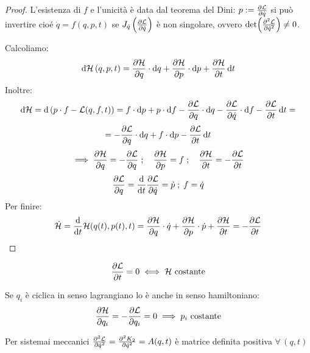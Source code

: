 \begin{proof}
    L'esistenza di $f$ e l'unicità è data dal teorema del Dini: $p:= \pdv{\mathcal{L}}{\dot{q}}(q,\dot{q},t)$ si può invertire
    cioé $\dot{q}= f(q,p,t)$ se $J_{\dot{q}}\left( \pdv{\mathcal{L}}{\dot{q}} \right)$ è non singolare, ovvero $\det(\pdv[2]{\mathcal{L}}{\dot{q}})\neq 0$.

    Calcoliamo:
    \begin{equation*}
        \dd{\mathcal{H}}(q,p,t)= \pdv{\mathcal{H}}{q}\cdot\dd{q}+\pdv{\mathcal{H}}{p}\cdot\dd{p}+\pdv{\mathcal{H}}{t}\dd{t}
    \end{equation*}
    Inoltre:
    \begin{equation*}
        \dd{\mathcal{H}}= \dd{\left( p\cdot f -\mathcal{L}(q,f,t) \right)}= 
        f\cdot\dd{p}+ p\cdot\dd{f}-\pdv{\mathcal{L}}{q}\cdot\dd{q}-\pdv{\mathcal{L}}{\dot{q}}\cdot\dd{f}-\pdv{\mathcal{L}}{t}\dd{t}=
    \end{equation*}
    \begin{equation*}
        = -\pdv{\mathcal{L}}{q}\cdot\dd{q}+f\cdot\dd{p}-\pdv{\mathcal{L}}{t}\dd{t}
    \end{equation*}
    \begin{equation}
        \implies \pdv{\mathcal{H}}{q}= -\pdv{\mathcal{L}}{q}\;;\quad \pdv{\mathcal{H}}{p}= f \;;\quad \pdv{\mathcal{H}}{t}= -\pdv{\mathcal{L}}{t}
    \end{equation}
    \begin{equation*}
        \pdv{\mathcal{L}}{q}= \dv{t}\pdv{\mathcal{L}}{\dot{q}} = \dot{p}\;;\; f = \dot{q}
    \end{equation*}
    Per finire:
    \begin{equation*}
        \dot{\mathcal{H}}= \dv{t}\mathcal{H}(q(t),p(t),t)= \pdv{\mathcal{H}}{q}\cdot \dot{q}+\pdv{\mathcal{H}}{p}\cdot\dot{p}+\pdv{\mathcal{H}}{t}= -\pdv{\mathcal{L}}{t}
    \end{equation*}
\end{proof}

\begin{remark}
    \begin{equation*}
        \pdv{\mathcal{L}}{t}=0 \iff \mathcal{H} \text{  costante}
    \end{equation*}
\end{remark}

\begin{remark}
    Se $q_i$ è ciclica in senso lagrangiano lo è anche in senso hamiltoniano:
    \begin{equation*}
        \pdv{\mathcal{H}}{q_i}= -\pdv{\mathcal{L}}{q_i}= 0 \implies p_i \text{  costante}
    \end{equation*}
\end{remark}
\begin{remark}
    Per sistemai meccanici $\pdv[2]{\mathcal{L}}{\dot{q}}= \pdv[2]{K_2}{\dot{q}}= A(q,t)$ è matrice definita positiva $\forall\,(q,t)$
\end{remark}


